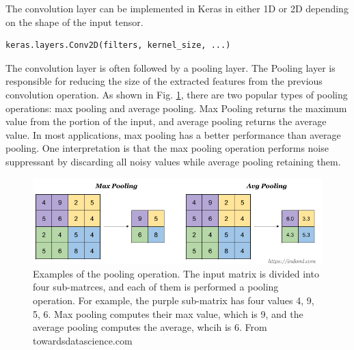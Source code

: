 The convolution layer can be implemented in Keras in either 1D or 2D depending on the shape of the input tensor.
\begin{lstlisting}[language=python,frame=single]
keras.layers.Conv2D(filters, kernel_size, ...)
\end{lstlisting}

The convolution layer is often followed by a pooling layer. The Pooling layer is responsible for reducing the size of the extracted features from the previous convolution operation. As shown in Fig. \ref{fig_pooling}, there are two popular types of pooling operations: max pooling and average pooling. Max Pooling returns the maximum value from the portion of the input, and average pooling returns the average value. In most applications, max pooling has a better performance than average pooling. One interpretation is that the max pooling operation performs noise suppressant by discarding all noisy values while average pooling retaining them.
\begin{figure}[h!]
\begin{center}
\includegraphics[width = 13cm]{img/pooling.png}
\caption{Examples of the pooling operation. The input matrix is divided into four sub-matrces, and each of them is performed a pooling operation. For example, the purple sub-matrix has four values 4, 9, 5, 6. Max pooling computes their max value, which is 9, and the average pooling computes the average, whcih is 6. From towardsdatascience.com \label{fig_pooling}}
\end{center}
\end{figure}

